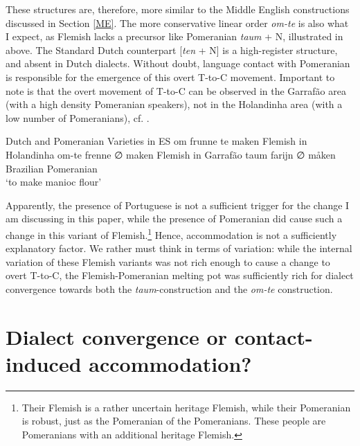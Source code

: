 \documentclass[output=paper,hidelinks,draftmode]{langscibook}
\begin{document}
These structures are, therefore, more similar to the Middle English constructions discussed in Section \ref{ME}. The more conservative linear order \textit{om-te} is also what I expect, as Flemish lacks a precursor like Pomeranian \textit{taum} + N, illustrated in  above. The Standard Dutch counterpart [\textit{ten} + N] is a high-register structure, and absent in Dutch dialects. Without doubt, language contact with Pomeranian is responsible for the emergence of this overt T-to-C movement. Important to note is that the overt movement of T-to-C can be observed in the Garrafão area (with a high density Pomeranian speakers), not in the Holandinha area (with a low number of Pomeranians), cf. .

\ea\label{ex:postma:16}
 Dutch and Pomeranian Varieties in ES
\ea om frunne te maken \hfill Flemish in Holandinha 
\ex om-te frenne ∅ maken \hfill Flemish in Garrafão 
\ex taum farijn ∅ måken \hfill Brazilian Pomeranian\\
\glt `to make manioc flour' \z\z

Apparently, the presence of Portuguese is not a sufficient trigger for the change I am discussing in this paper, while the presence of Pomeranian did cause such a change in this variant of Flemish.\footnote{Their Flemish is a rather uncertain heritage Flemish, while their Pomeranian is robust, just as the Pomeranian of the Pomeranians. These people are Pomeranians with an additional heritage Flemish.} Hence, accommodation is not a sufficiently explanatory factor. We rather must think in terms of variation: while the internal variation of these Flemish variants was not rich enough to cause a change to overt T-to-C, the Flemish-Pomeranian melting pot was sufficiently rich for dialect convergence towards both the \textit{taum}{}-construction and the \textit{om-te} construction. 

\section{Dialect convergence or contact-induced accommodation?}
\end{document}
